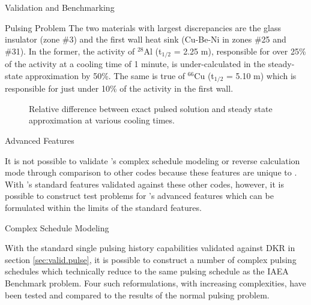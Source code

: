 \begin{chapter}{Validation and Benchmarking}
\begin{section}{Pulsing Problem\label{sec:valid.pulse}}
    The two materials with largest discrepancies are the glass
    insulator (zone \#3) and the first wall heat sink (Cu-Be-Ni in
    zones \#25 and \#31).  In the former, the activity of $^{28}$Al
    (t$_{1/2}$ = 2.25 m), responsible for over 25\% of the activity at
    a cooling time of 1 minute, is under-calculated in the
    steady-state approximation by 50\%.  The same is true of $^{66}$Cu
    (t$_{1/2}$ = 5.10 m) which is responsible for just under 10\% of
    the activity in the first wall.
    
    \begin{figure}[htbp]
      \begin{center}
        \caption{Relative difference between exact pulsed solution and steady state approximation at various cooling times.}
        \label{fig:rel.diff.approx}
      \end{center}
    \end{figure}
    
  \end{section}

  \begin{section}{Advanced Features}
  
    It is not possible to validate \ALARA's complex schedule modeling
    or reverse calculation mode through comparison to other codes
    because these features are unique to \ALARA.  With \ALARA's
    standard features validated against these other codes, however, it
    is possible to construct test problems for \ALARA's advanced
    features which can be formulated within the limits of the standard
    features.

    \begin{subsection}{Complex Schedule Modeling}
    
      With the standard single pulsing history capabilities validated
      against DKR in section \ref{sec:valid.pulse}, it is possible to
      construct a number of complex pulsing schedules which
      technically reduce to the same pulsing schedule as the IAEA
      Benchmark problem.  Four such reformulations, with increasing
      complexities, have been tested and compared to the results of
      the normal pulsing problem.
    

\end{subsection}
\end{section}
\end{chapter}
